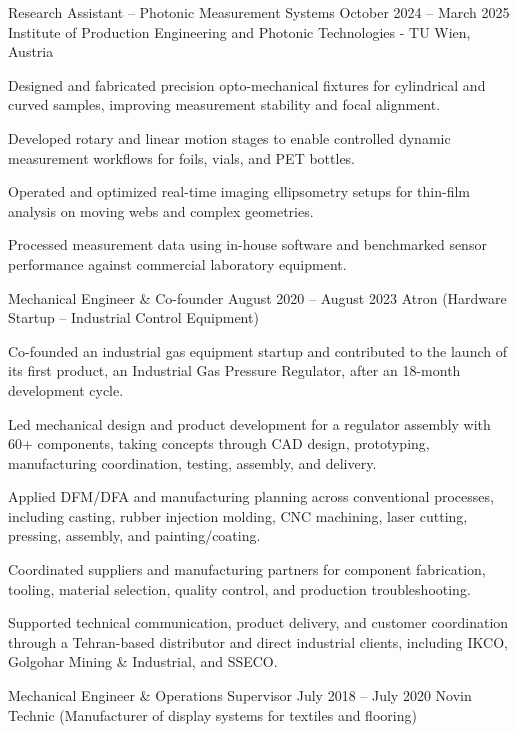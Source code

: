 \ExperienceHeader
{Research Assistant -- Photonic Measurement Systems}
{October 2024 -- March 2025}
{Institute of Production Engineering and Photonic Technologies - TU Wien, Austria}

\begin{cvitems}
  \item Designed and fabricated precision opto-mechanical fixtures for cylindrical and curved samples, improving measurement stability and focal alignment.
  \item Developed rotary and linear motion stages to enable controlled dynamic measurement workflows for foils, vials, and PET bottles.
  \item Operated and optimized real-time imaging ellipsometry setups for thin-film analysis on moving webs and complex geometries.
  \item Processed measurement data using in-house software and benchmarked sensor performance against commercial laboratory equipment.
\end{cvitems}

\ExperienceHeader
{Mechanical Engineer \& Co-founder}
{August 2020 -- August 2023}
{Atron (Hardware Startup -- Industrial Control Equipment)}

\begin{cvitems}
  \item Co-founded an industrial gas equipment startup and contributed to the launch of its first product, an Industrial Gas Pressure Regulator, after an 18-month development cycle.
  \item Led mechanical design and product development for a regulator assembly with 60+ components, taking concepts through CAD design, prototyping, manufacturing coordination, testing, assembly, and delivery.
  \item Applied DFM/DFA and manufacturing planning across conventional processes, including casting, rubber injection molding, CNC machining, laser cutting, pressing, assembly, and painting/coating.
  \item Coordinated suppliers and manufacturing partners for component fabrication, tooling, material selection, quality control, and production troubleshooting.
  \item Supported technical communication, product delivery, and customer coordination through a Tehran-based distributor and direct industrial clients, including IKCO, Golgohar Mining \& Industrial, and SSECO.
\end{cvitems}

\ExperienceHeader
{Mechanical Engineer \& Operations Supervisor}
{July 2018 -- July 2020}
{Novin Technic (Manufacturer of display systems for textiles and flooring)}

